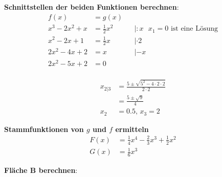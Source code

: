 \documentclass{article}
\begin{document}
\textbf{Schnittstellen der beiden Funktionen berechnen}:
\begin{align*}
  f(x) &= g(x) \\
  x^3 - 2x^2 + x &= \frac{1}{2}x^2 && | :x \text{ $x_1 = 0$ ist eine Lösung} \\
  x^2 - 2x + 1 &= \frac{1}{2}x && | \cdot 2 \\
  2 x^2 - 4x + 2 &= x && | - x \\
  2 x^2 - 5x + 2 &= 0 \\
\end{align*}

\begin{align*}
  x_{2|3} &= \frac{5 \pm \sqrt{5^2 - 4 \cdot 2 \cdot 2}}{2 \cdot 2} \\
          &= \frac{5 \pm \sqrt{9}}{4} \\
  x_2 &= 0.5, \, x_3 = 2 
\end{align*}

\textbf{Stammfunktionen von $g$ und $f$ ermitteln}
\begin{align*}
  F(x) &= \frac{1}{4}x^4 - \frac{2}{3}x^3 + \frac{1}{2}x^2 \\
  G(x) &= \frac{1}{6}x^3 
\end{align*}

\newpage
\textbf{Fläche B berechnen}:
\end{document}
